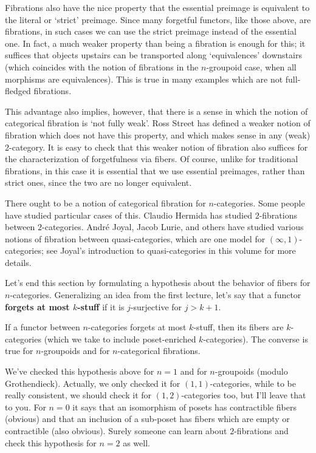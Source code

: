 \documentclass[12pt]{amsart}
\begin{document}
Fibrations also have the nice property that the essential preimage is
equivalent to the literal or `strict' preimage.  Since many forgetful
functors, like those above, are fibrations, in such cases we can use
the strict preimage instead of the essential one.  In fact, a much
weaker property than being a fibration is enough for this; it suffices
that objects upstairs can be transported along `equivalences'
downstairs (which coincides with the notion of fibrations in the
$n$-groupoid case, when all morphisms are equivalences).  This is true
in many examples which are not full-fledged fibrations.

This advantage also implies, however, that there is a sense in which
the notion of categorical fibration is `not fully weak'.  Ross Street
has defined a weaker notion of fibration which does not have this
property, and which makes sense in any (weak) 2-category.  It is easy
to check that this weaker notion of fibration also suffices for the
characterization of forgetfulness via fibers.  Of course, unlike for
traditional fibrations, in this case it is essential that we use
essential preimages, rather than strict ones, since the two are no
longer equivalent.

There ought to be a notion of categorical fibration for
$n$-categories.  Some people have studied particular cases of this.
Claudio Hermida has studied $2$-fibrations between $2$-categories.
Andr\'e Joyal, Jacob Lurie, and others have studied various notions of
fibration between quasi-categories, which are one model for
$(\infty,1)$-categories; see Joyal's introduction to quasi-categories
in this volume for more details.

Let's end this section by formulating a hypothesis about the behavior
of fibers for $n$-categories.  Generalizing an idea from the first
lecture, let's say that a functor \textbf{forgets at most $k$-stuff}
if it is $j$-surjective for $j>k+1$.

\begin{hyp}
  If a functor between $n$-categories forgets at most $k$-stuff, then
  its fibers are $k$-categories (which we take to include
  poset-enriched $k$-categories).  The converse is true for
  $n$-groupoids and for $n$-categorical fibrations.
\end{hyp}

We've checked this hypothesis above for $n=1$ and for $n$-groupoids
(modulo Grothendieck).  Actually, we only checked it for
$(1,1)$-categories, while to be really consistent, we should check it
for $(1,2)$-categories too, but I'll leave that to you.  For $n=0$ it
says that an isomorphism of posets has contractible fibers (obvious)
and that an inclusion of a sub-poset has fibers which are empty or
contractible (also obvious).  Surely someone can learn about
$2$-fibrations and check this hypothesis for $n=2$ as well.
\end{document}
